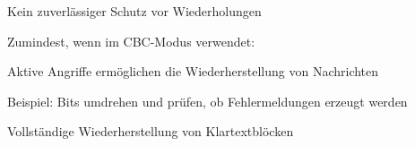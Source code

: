 \documentclass[a4paper]{article}
\begin{document}
\begin{multicols}{3}
\begin{itemize*}
            \begin{itemize*}
                  \item Kein zuverlässiger Schutz vor Wiederholungen
                  \item Zumindest, wenn im CBC-Modus verwendet:
                  \begin{itemize*}
                        \item Aktive Angriffe ermöglichen die Wiederherstellung von Nachrichten
                        \item Beispiel: Bits umdrehen und prüfen, ob Fehlermeldungen erzeugt werden
                        \item Vollständige Wiederherstellung von Klartextblöcken
                  \end{itemize*}
            \end{itemize*}
      \end{itemize*}


\end{multicols}
\end{document}

